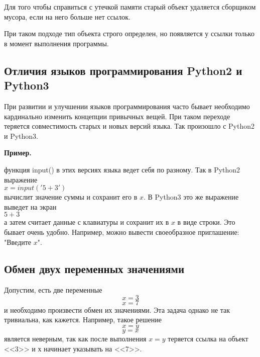 \documentclass[a4paper, fleqn]{article}
\newenvironment{example}[1][]{\medskip \noindent \textbf{Пример. #1}\par \nopagebreak}{\medskip \par} %
\begin{document}
		Для того чтобы справиться с утечкой памяти старый объект удаляется сборщиком мусора, если на него больше нет ссылок.
		
		При таком подходе тип объекта строго определен, но появляется у ссылки только в момент выполнения программы.
		
		
		
	\subsection*{Отличия языков программирования Python2 и Python3}
	
		При развитии и улучшении языков программирования часто бывает необходимо кардинально изменить концепции привычных вещей. При таком переходе теряется совместимость старых и новых версий языка. Так произошло с Python2 и Python3. 
		
		\begin{example}
			
			функция input() в этих версиях языка ведет себя по разному. Так в Python2 выражение\\
			$x = input('5 + 3')$\\
			вычислит значение суммы и сохранит его в $x$.
			В Python3 это же выражение выведет на экран\\
			$5 + 3$\\
			а затем считает данные с клавиатуры и сохранит их в $x$ в виде строки.
			Это бывает очень удобно. Например, можно вывести своеобразное приглашение: "Введите $x$". 
			
		\end{example}
		
	\subsection*{Обмен двух переменных значениями}
	
	
	Допустим, есть две переменные 
	\[x=3\] 
	\[x=7\]
	и необходимо произвести обмен их значениями. Эта задача однако не так тривиальна, как кажется. Например, такое решение 
	\[x=y\]
	\[y=x\]
	является неверным, так как после выполнения $x=y$ теряется ссылка на объект <<3>> и $х$ начинает указывать на <<7>>.
	
\end{document}
